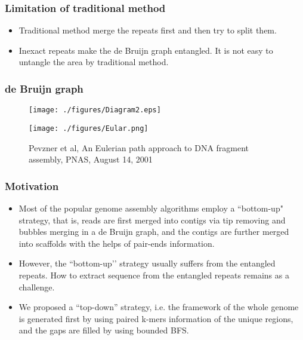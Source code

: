 \documentclass[mathserif]{beamer}
\begin{document}
	
		\begin{frame}
			\frametitle{Limitation of traditional method}
			\begin{itemize}
				\item Traditional method merge the repeats first and then try to split them.
				\item Inexact repeats make the de Bruijn graph entangled. It is not easy to untangle the area by traditional method.
			\end{itemize}
		\end{frame}
		\begin{frame}
			\frametitle{de Bruijn graph}
			\begin{figure}
				\centering
				\texttt{[image: ./figures/Diagram2.eps]}
			\end{figure}
		\end{frame}
		\begin{frame}
		\begin{figure}
				\centering
				\texttt{[image: ./figures/Eular.png]}
				\caption{\tiny Pevzner et al, An Eulerian path approach to DNA fragment assembly, PNAS, August 14, 2001} 
			\end{figure}
		\end{frame}
	
		\begin{frame}
			\frametitle{Motivation}
			\begin{itemize}
				\item Most of the popular genome assembly algorithms employ a ``bottom-up" strategy, that is, reads are first merged into contigs via tip removing and bubbles merging in a de Bruijn graph, and the contigs are further merged into scaffolds with the helps of pair-ends information.  
				\item However, the “bottom-up’’ strategy usually suffers from the entangled repeats. How to extract sequence from the entangled repeats remains as a challenge.
				\item We proposed a “top-down” strategy, i.e. the framework of the whole genome is generated first by using paired k-mers information of the unique regions, and the gaps are filled by using bounded BFS. 
			\end{itemize}
		\end{frame}
\end{document}
